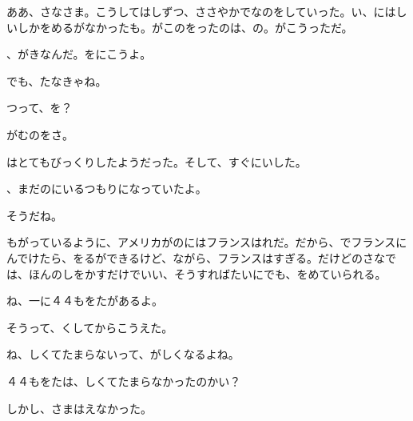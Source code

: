 ああ、さなさま。こうしてはしずつ、ささやかでなのをしていった。い、にはしいしかをめるがなかったも。がこのをったのは、の。がこうっただ。

、がきなんだ。をにこうよ。

でも、たなきゃね。

つって、を？

がむのをさ。

はとてもびっくりしたようだった。そして、すぐにいした。

、まだのにいるつもりになっていたよ。

そうだね。

もがっているように、アメリカがのにはフランスはれだ。だから、でフランスにんでけたら、をるができるけど、ながら、フランスはすぎる。だけどのさなでは、ほんのしをかすだけでいい、そうすればたいにでも、をめていられる。

ね、一に４４もをたがあるよ。

そうって、くしてからこうえた。

ね、しくてたまらないって、がしくなるよね。

４４もをたは、しくてたまらなかったのかい？

しかし、さまはえなかった。


